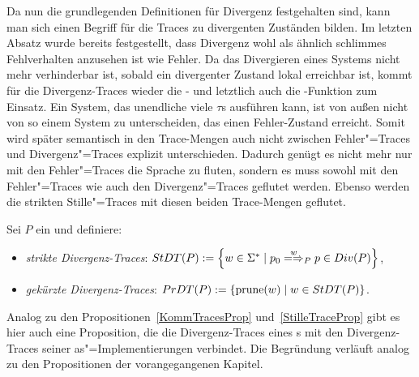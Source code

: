 Da nun die grundlegenden Definitionen für Divergenz festgehalten sind, kann man
sich einen Begriff für die Traces zu divergenten Zuständen bilden. Im letzten
Absatz wurde bereits festgestellt, dass Divergenz wohl als ähnlich \glqq
schlimmes\grqq{} Fehlverhalten anzusehen ist wie Fehler. Da das Divergieren
eines Systems nicht mehr verhinderbar ist, sobald ein divergenter Zustand lokal
erreichbar ist, kommt für die Divergenz-Traces wieder die \prune{}- und
letztlich auch die \cont{}-Funktion zum Einsatz. Ein System, das unendliche
viele $\tau$s ausführen kann, ist von außen nicht von so einem System zu
unterscheiden, das einen Fehler-Zustand erreicht. Somit wird später semantisch
in den Trace-Mengen auch nicht zwischen Fehler"=Traces und Divergenz"=Traces
explizit unterschieden. Dadurch genügt es nicht mehr nur mit den Fehler"=Traces
die Sprache zu fluten, sondern es muss sowohl mit den Fehler"=Traces wie auch
den Divergenz"=Traces geflutet werden. Ebenso werden die strikten
Stille"=Traces mit diesen beiden Trace-Mengen geflutet.

\begin{Def}
  Sei $P$ ein \MEIO{} und definiere:
  \begin{itemize}
    \item \emph{strikte Divergenz-Traces}: $\StDT (P) := \left\{w\in\Sigma
      ^*\mid p_0\weakmay[w]_P p\in Div(P)\right\}$,
    \item \emph{gekürzte Divergenz-Traces}: $PrDT (P) := \left\{\mathrm{prune} (w)\mid
      w\in StDT (P)\right\}$.
  \end{itemize}
\end{Def}

Analog zu den Propositionen~\ref{KommTracesProp} und~\ref{StilleTraceProp} gibt
es hier auch eine Proposition, die die Divergenz-Traces eines \MEIO{}s mit den
Divergenz-Traces seiner as"=Implementierungen verbindet. Die Begründung
verläuft analog zu den Propositionen der vorangegangenen Kapitel.

